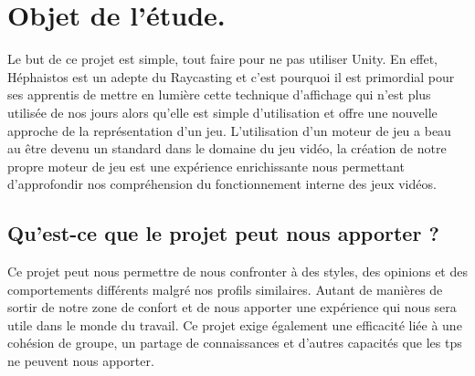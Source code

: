 \documentclass[french, 12pt]{article}
\begin{document}
    \section{Objet de l'étude.}
    \begin{flushleft}

    Le but de ce projet est simple, tout faire pour ne pas utiliser Unity. En effet, Héphaistos est un adepte du Raycasting et c’est pourquoi il est primordial pour ses apprentis de mettre en lumière cette technique d’affichage qui n’est plus utilisée de nos jours alors qu’elle est simple d’utilisation et offre une nouvelle approche de la représentation d’un jeu. L'utilisation d'un moteur de jeu a beau au être devenu un standard dans le domaine du jeu vidéo, la création de notre propre moteur de jeu est une expérience enrichissante nous permettant d'approfondir nos compréhension du fonctionnement interne des jeux vidéos.

    \subsection{Qu'est-ce que le projet peut nous apporter ?}
    \color{black}

    Ce projet peut nous permettre de nous confronter à des styles, des opinions et des comportements différents malgré nos profils similaires. Autant de manières de sortir de notre zone de confort et de nous apporter une expérience qui nous sera utile dans le monde du travail. Ce projet exige également une efficacité liée à une cohésion de groupe, un partage de connaissances et d'autres capacités que les tps ne peuvent nous apporter.

    \end{flushleft} \newpage

    
\end{document}
